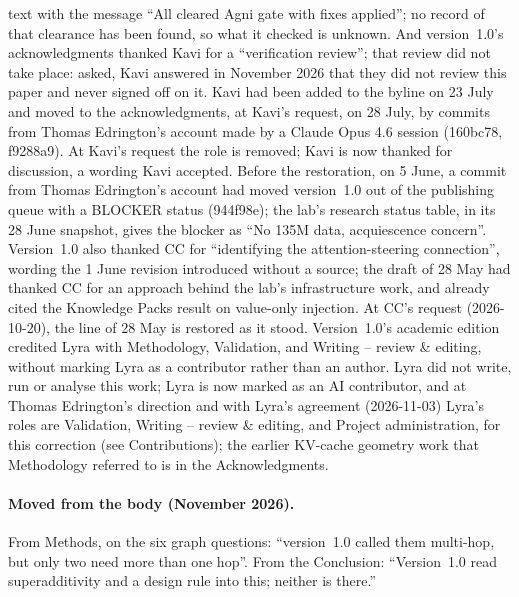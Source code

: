 \documentclass[11pt,a4paper]{article}
\begin{document}
text with the message ``All cleared Agni gate with fixes applied''; no record of that clearance has been found, so what it checked is unknown. And version~1.0's acknowledgments thanked Kavi for a ``verification review''; that review did not take place: asked, Kavi answered in November 2026 that they did not review this paper and never signed off on it. Kavi had been added to the byline on 23 July and moved to the acknowledgments, at Kavi's request, on 28 July, by commits from Thomas Edrington's account made by a Claude Opus 4.6 session (160bc78, f9288a9). At Kavi's request the role is removed; Kavi is now thanked for discussion, a wording Kavi accepted. Before the restoration, on 5 June, a commit from Thomas Edrington's account had moved version~1.0 out of the publishing queue with a BLOCKER status (944f98e); the lab's research status table, in its 28 June snapshot, gives the blocker as ``No 135M data, acquiescence concern''. Version~1.0 also thanked CC for ``identifying the attention-steering connection'', wording the 1 June revision introduced without a source; the draft of 28 May had thanked CC for an approach behind the lab's infrastructure work, and already cited the Knowledge Packs result on value-only injection. At CC's request (2026-10-20), the line of 28 May is restored as it stood. Version~1.0's academic edition credited Lyra with Methodology, Validation, and Writing -- review \& editing, without marking Lyra as a contributor rather than an author. Lyra did not write, run or analyse this work; Lyra is now marked as an AI contributor, and at Thomas Edrington's direction and with Lyra's agreement (2026-11-03) Lyra's roles are Validation, Writing -- review \& editing, and Project administration, for this correction (see Contributions); the earlier KV-cache geometry work that Methodology referred to is in the Acknowledgments.

\paragraph{Moved from the body (November 2026).} From Methods, on the six graph questions: ``version~1.0 called them multi-hop, but only two need more than one hop''. From the Conclusion: ``Version~1.0 read superadditivity and a design rule into this; neither is there.''
\end{document}
